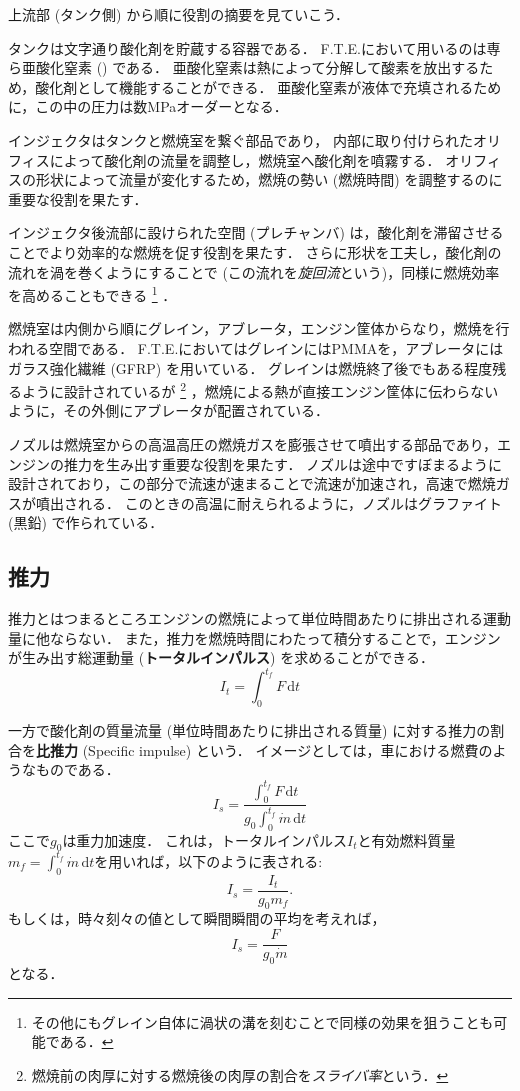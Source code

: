 \documentclass[uplatex,dvipdfmx,a4j,11pt]{jsreport}
\newcommand{\keyword}[1]{\textcolor{mainblue}{\textbf{#1}}}
\newcommand{\diff}{\mathrm{d}} %
\numberwithin{equation}{chapter}
\begin{document}
上流部 (タンク側) から順に役割の摘要を見ていこう．

タンクは文字通り酸化剤を貯蔵する容器である．
F.T.E.において用いるのは専ら亜酸化窒素 () である．
亜酸化窒素は熱によって分解して酸素を放出するため，酸化剤として機能することができる．
亜酸化窒素が液体で充填されるために，この中の圧力は数\unit{\mega\pascal}オーダーとなる．

インジェクタはタンクと燃焼室を繋ぐ部品であり，
内部に取り付けられたオリフィスによって酸化剤の流量を調整し，燃焼室へ酸化剤を噴霧する．
オリフィスの形状によって流量が変化するため，燃焼の勢い (燃焼時間) を調整するのに重要な役割を果たす．

インジェクタ後流部に設けられた空間 (プレチャンバ) は，酸化剤を滞留させることでより効率的な燃焼を促す役割を果たす．
さらに形状を工夫し，酸化剤の流れを渦を巻くようにすることで (この流れを\emph{旋回流}という)，同様に燃焼効率を高めることもできる
\footnote{その他にもグレイン自体に渦状の溝を刻むことで同様の効果を狙うことも可能である．}
．

燃焼室は内側から順にグレイン，アブレータ，エンジン筐体からなり，燃焼を行われる空間である．
F.T.E.においてはグレインにはPMMAを，アブレータにはガラス強化繊維 (GFRP) を用いている．
グレインは燃焼終了後でもある程度残るように設計されているが
\footnote{燃焼前の肉厚に対する燃焼後の肉厚の割合を\emph{スライバ率}という．}
，燃焼による熱が直接エンジン筐体に伝わらないように，その外側にアブレータが配置されている．

ノズルは燃焼室からの高温高圧の燃焼ガスを膨張させて噴出する部品であり，エンジンの推力を生み出す重要な役割を果たす．
ノズルは途中ですぼまるように設計されており，この部分で流速が速まることで流速が加速され，高速で燃焼ガスが噴出される．
このときの高温に耐えられるように，ノズルはグラファイト (黒鉛) で作られている．

\subsection{推力}
推力とはつまるところエンジンの燃焼によって単位時間あたりに排出される運動量に他ならない．
また，推力を燃焼時間にわたって積分することで，エンジンが生み出す総運動量 (\keyword{トータルインパルス}) を求めることができる．
\begin{equation}
  I_{t} = \int_0^{t_f} F \, \diff t
\end{equation}

一方で酸化剤の質量流量 (単位時間あたりに排出される質量) に対する推力の割合を\keyword{比推力} (Specific impulse) という．
イメージとしては，車における燃費のようなものである．
\begin{equation}
  I_{s} = \frac{\int_0^{t_f} F \, \diff t}{ g_0 \int_0^{t_f} \dot{m} \, \diff t}
\end{equation}
ここで$g_0$は重力加速度．
これは，トータルインパルス$I_{t}$と有効燃料質量$m_f = \int_0^{t_f} \dot{m} \, \diff t$を用いれば，以下のように表される:
\begin{equation}
  I_{s} = \frac{I_{t}}{g_0 m_f}.
\end{equation}
もしくは，時々刻々の値として瞬間瞬間の平均を考えれば，
\begin{equation}
  I_{s} = \frac{F}{g_0 \dot{m}}
\end{equation}
となる．
\end{document}
